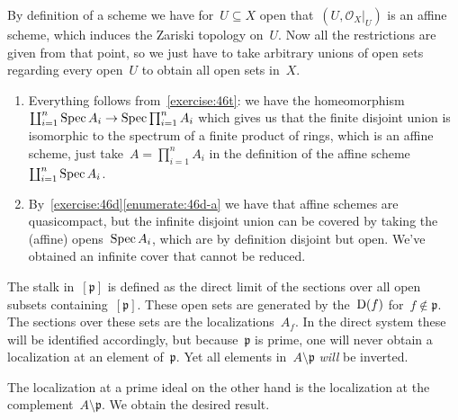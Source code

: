 \begin{exercise}
  By definition of a scheme we have for~$U\subseteq X$ open that~$(U,\mathcal{O}_X|_U)$ is an affine scheme, which induces the Zariski topology on~$U$. Now all the restrictions are given from that point, so we just have to take arbitrary unions of open sets regarding every open~$U$ to obtain all open sets in~$X$.
\end{exercise}

\begin{exercise}
  \begin{enumerate}
    \item Everything follows from~\autoref{exercise:46t}: we have the homeomorphism~$\coprod_{i=1}^n\operatorname{Spec} A_i\to\operatorname{Spec}\prod_{i=1}^nA_i$ which gives us that the finite disjoint union is isomorphic to the spectrum of a finite product of rings, which is an affine scheme, just take~$A=\prod_{i=1}^nA_i$ in the definition of the affine scheme~$\coprod_{i=1}^n\operatorname{Spec} A_i$.

    \item By~\autoref{exercise:46d}\ref{enumerate:46d-a} we have that affine schemes are quasicompact, but the infinite disjoint union can be covered by taking the (affine) opens~$\operatorname{Spec} A_i$, which are by definition disjoint but open. We've obtained an infinite cover that cannot be reduced.\qedhere
  \end{enumerate}
\end{exercise}

\begin{exercise}
  The stalk in~$[\mathfrak{p}]$ is defined as the direct limit of the sections over all open subsets containing~$[\mathfrak{p}]$. These open sets are generated by the~$\operatorname{D}(f)$ for~$f\notin\mathfrak{p}$. The sections over these sets are the localizations~$A_f$. In the direct system these will be identified accordingly, but because~$\mathfrak{p}$ is prime, one will never obtain a localization at an element of~$\mathfrak{p}$. Yet all elements in~$A\setminus\mathfrak{p}$ \emph{will} be inverted.
  
  The localization at a prime ideal on the other hand is the localization at the complement~$A\setminus\mathfrak{p}$. We obtain the desired result.
\end{exercise}
